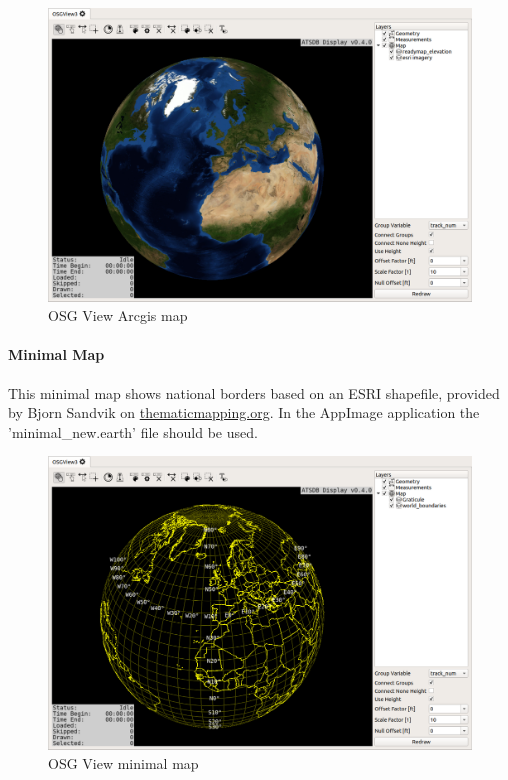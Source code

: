 {\begin{figure}[H]
    \hspace*{-2cm}
    \includegraphics[width=18cm,frame]{../screenshots/osgview_arcgis.png}
  \caption{OSG View Arcgis map}
\end{figure}

\newpage
\paragraph{Minimal Map}

This minimal map shows national borders based on an ESRI shapefile, provided by Bjorn Sandvik on \url{thematicmapping.org}. In the AppImage application the 'minimal\_new.earth' file should be used.

\begin{figure}[H]
    \hspace*{-2cm}
    \includegraphics[width=18cm,frame]{../screenshots/osgview_minimal.png}
  \caption{OSG View minimal map}
\end{figure}

}
